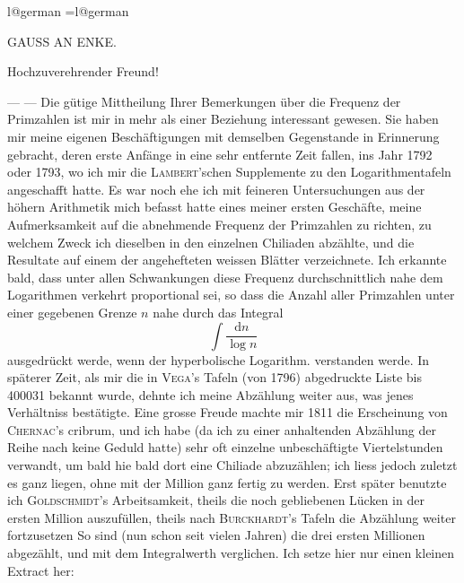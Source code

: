 \clearpage
{}%
\renewcommand{\BookRunningTitle}{Gauss an Enke}
\begingroup
\ifcsname l@german\endcsname
\language=\csname l@german\endcsname
{}
\else\PackageError{Gauss source}{German language patterns unavailable}{Load the historical German hyphenation patterns before continuing this build.}\fi
\begin{center}{\large GAUSS AN ENKE.}\end{center}
\begin{center}Hochzuverehrender Freund!\end{center}

— — Die gütige Mittheilung Ihrer Bemerkungen über die Frequenz der Primzahlen ist mir in mehr als einer Beziehung interessant gewesen. Sie haben mir meine eigenen Beschäftigungen mit demselben Gegenstande in Erinnerung gebracht, deren erste Anfänge in eine sehr entfernte Zeit fallen, ins Jahr 1792 oder 1793, wo ich mir die \textsc{Lambert}’schen Supplemente zu den Logarithmentafeln angeschafft hatte. Es war noch ehe ich mit feineren Untersuchungen aus der höhern Arithmetik mich befasst hatte eines meiner ersten Geschäfte, meine Aufmerksamkeit auf die abnehmende Frequenz der Primzahlen zu richten, zu welchem Zweck ich dieselben in den einzelnen Chiliaden abzählte, und die Resultate auf einem der angehefteten weissen Blätter verzeichnete. Ich erkannte bald, dass unter allen Schwankungen diese Frequenz durchschnittlich nahe dem Logarithmen verkehrt proportional sei, so dass die Anzahl aller Primzahlen unter einer gegebenen Grenze $n$ nahe durch das Integral
\[
\int\frac{\mathrm{d}n}{\log n}
\]
ausgedrückt werde, wenn der hyperbolische Logarithm. verstanden werde. In späterer Zeit, als mir die in \textsc{Vega}’s Tafeln (von 1796) abgedruckte Liste bis 400031 bekannt wurde, dehnte ich meine Abzählung weiter aus, was jenes Verhältniss bestätigte. Eine grosse Freude machte mir 1811 die Erscheinung von \textsc{Chernac}’s
%
cribrum, und ich habe (da ich zu einer anhaltenden Abzählung der Reihe nach keine Geduld hatte) sehr oft einzelne unbeschäftigte Viertelstunden verwandt, um bald hie bald dort eine Chiliade abzuzählen; ich liess jedoch zuletzt es ganz liegen, ohne mit der Million ganz fertig zu werden. Erst später benutzte ich \textsc{Goldschmidt}’s Arbeitsamkeit, theils die noch gebliebenen Lücken in der ersten Million auszufüllen, theils nach \textsc{Burck\-hardt}’s Tafeln die Abzählung weiter fortzusetzen So sind (nun schon seit vielen Jahren) die drei ersten Millionen abgezählt, und mit dem Integralwerth verglichen. Ich setze hier nur einen kleinen Extract her:

